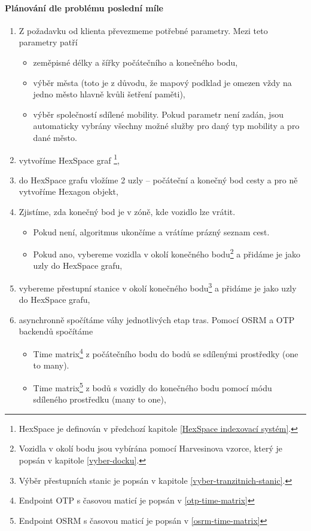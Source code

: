\documentclass[thesis=M,czech]{FITthesis}[2019/12/23]
\theoremstyle{plain}
\theoremstyle{definition}
\begin{document}
\paragraph{Plánování dle problému poslední míle}



\begin{enumerate}
	\item Z požadavku od klienta převezmeme potřebné parametry. Mezi teto parametry patří
	\begin{itemize}
		\item zeměpisné délky a šířky počátečního a konečného bodu,
		\item výběr města (toto je z důvodu, že mapový podklad je omezen vždy na jedno město hlavně kvůli šetření paměti),
		\item výběr společností sdílené mobility. Pokud parametr není zadán, jsou automaticky vybrány všechny možné služby pro daný typ mobility a pro dané město.
	\end{itemize}
	\item vytvoříme HexSpace graf \footnote{HexSpace je definován v předchozí kapitole \ref{HexSpace indexovací systém}.},
	\item do HexSpace grafu vložíme 2 uzly -- počáteční a konečný bod cesty a pro ně vytvoříme Hexagon objekt,
	\item Zjistíme, zda konečný bod je v zóně, kde vozidlo lze vrátit. 
	\begin{itemize}
		\item Pokud není, algoritmus ukončíme a vrátíme prázný seznam cest.
		\item Pokud ano, vybereme vozidla v okolí konečného bodu\footnote{Vozidla v okolí bodu jsou vybírána pomocí Harvesinova vzorce, který je popsán v kapitole \ref{vyber-docku}.} a přidáme je jako uzly do HexSpace grafu,

	\end{itemize}

	\item vybereme přestupní stanice v okolí konečného bodu\footnote{Výběr přestupních stanic je popsán v kapitole \ref{vyber-tranzitnich-stanic}.} a přidáme je jako uzly do HexSpace grafu, 
	\item asynchronně spočítáme váhy jednotlivých etap tras. Pomocí OSRM a OTP backendů spočítáme 
	\begin{itemize}
		\item Time matrix\footnote{Endpoint OTP s časovou maticí je popsán v \ref{otp-time-matrix}} z počátečního bodu do bodů se sdílenými prostředky (one to many).
		\item Time matrix\footnote{Endpoint OSRM s časovou maticí je popsán v \ref{osrm-time-matrix}} z bodů s vozidly  do konečného bodu pomocí módu sdíleného prostředku (many to one),


\end{itemize}
\end{enumerate}
\end{document}
